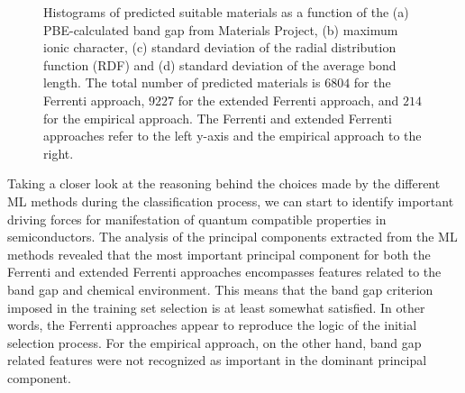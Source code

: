 \documentclass[superscriptaddress,unsortedaddress,
 amsmath,amssymb,
 aps,
]{revtex4-2}
\begin{document}
\begin{figure}[ht]
    \begin{subfigure}[b]{1\textwidth}
    \centering
    
  \end{subfigure}
  \par\bigskip
\begin{subfigure}[b]{0.45\textwidth}
    
    \subcaption{}
\end{subfigure}
\begin{subfigure}[b]{0.45\textwidth}
    
    \subcaption{}
\end{subfigure}%

\begin{subfigure}[b]{0.45\textwidth}
    
    \subcaption{}
\end{subfigure}
\begin{subfigure}[b]{0.45\textwidth}
    
    \subcaption{}
\end{subfigure}
\caption{Histograms of predicted suitable materials as a function of the (a) PBE-calculated band gap from Materials Project, (b) maximum ionic character, (c) standard deviation of the radial distribution function (RDF) and (d) standard deviation of the average bond length. The total number of predicted materials is  $6804$ for the Ferrenti approach, $9227$ for the extended Ferrenti approach, and $214$ for the empirical approach. The Ferrenti and extended Ferrenti approaches refer to the left y-axis and the empirical approach to the right.
    }
\label{fig:histogram_new}
\end{figure}

Taking a closer look at the reasoning behind the choices made by the different ML methods during the classification process, we can start to identify important driving forces for manifestation of quantum compatible properties in semiconductors. 
The analysis of the principal components extracted from the ML methods revealed that the most important principal component for both the Ferrenti and extended Ferrenti approaches encompasses features related to the band gap and chemical environment. This means that the band gap criterion imposed in the training set selection is at least somewhat satisfied. In other words, the Ferrenti approaches appear to reproduce the logic of the initial selection process. For the empirical approach, on the other hand, band gap related features were not recognized as important in the dominant principal component. 
\end{document}
